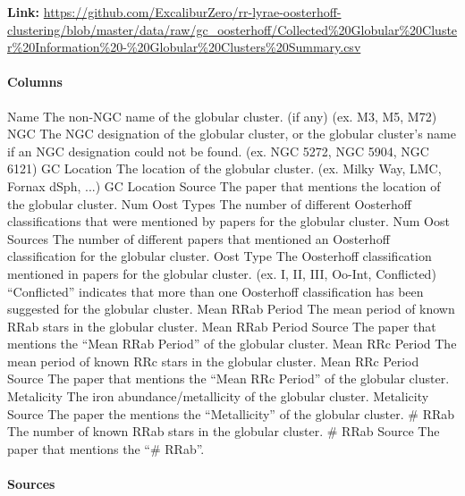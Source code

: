 \documentclass[]{article}
\begin{document}
\textbf{Link:} \url{https://github.com/ExcaliburZero/rr-lyrae-oosterhoff-clustering/blob/master/data/raw/gc_oosterhoff/Collected\%20Globular\%20Cluster\%20Information\%20-\%20Globular\%20Clusters\%20Summary.csv}

\paragraph{Columns}

\begin{outline}
	\1 Name
	\2 The non-NGC name of the globular cluster. (if any) (ex. M3, M5, M72)
	\1 NGC
	\2 The NGC designation of the globular cluster, or the globular cluster’s name if an NGC designation could not be found. (ex. NGC 5272, NGC 5904, NGC 6121)
	\1 GC Location
	\2 The location of the globular cluster. (ex. Milky Way, LMC, Fornax dSph, ...)
	\1 GC Location Source
	\2 The paper that mentions the location of the globular cluster.
	\1 Num Oost Types
	\2 The number of different Oosterhoff classifications that were mentioned by papers for the globular cluster.
	\1 Num Oost Sources
	\2 The number of different papers that mentioned an Oosterhoff classification for the globular cluster.
	\1 Oost Type
	\2 The Oosterhoff classification mentioned in papers for the globular cluster. (ex. I, II, III, Oo-Int, Conflicted)
	\2 ``Conflicted'' indicates that more than one Oosterhoff classification has been suggested for the globular cluster.
	\1 Mean RRab Period
	\2 The mean period of known RRab stars in the globular cluster.
	\1 Mean RRab Period Source
	\2 The paper that mentions the ``Mean RRab Period'' of the globular cluster.
	\1 Mean RRc Period
	\2 The mean period of known RRc stars in the globular cluster.
	\1 Mean RRc Period Source
	\2 The paper that mentions the ``Mean RRc Period'' of the globular cluster.
	\1 Metalicity
	\2 The iron abundance/metallicity of the globular cluster.
	\1 Metalicity Source
	\2 The paper the mentions the ``Metallicity'' of the globular cluster.
	\1 \# RRab
	\2 The number of known RRab stars in the globular cluster.
	\1 \# RRab Source
	\2 The paper that mentions the ``\# RRab''.
\end{outline}

\paragraph{Sources}
\end{document}
